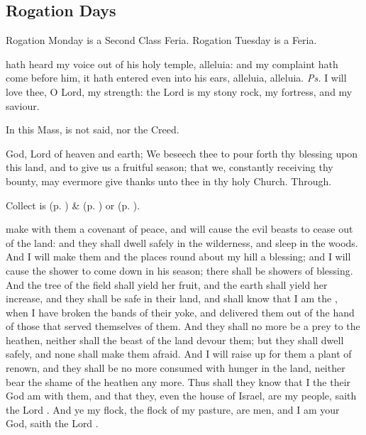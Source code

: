 \clearpage
\subsection{Rogation Days}
\begin{rubric}
	Rogation Monday is a Second Class Feria. Rogation Tuesday is a Feria.
\end{rubric}

\introit
{} hath heard my voice out of his holy temple, alleluia: and my complaint hath come before him, it hath entered even into his ears, alleluia, alleluia. \textit{Ps.} I will love thee, O Lord, my strength: the Lord is my stony rock, my fortress, and my saviour.
\begin{rubric}
    In this Mass,  is not said, nor the Creed.
\end{rubric}

\collect
{} God, Lord of heaven and earth; We beseech thee to pour forth thy blessing upon this land, and to give us a fruitful season; that we, constantly receiving thy bounty, may evermore give thanks unto thee in thy holy Church. Through.
\begin{rubric}
     Collect is  (p. \pageref{SPMaryInEaster}) \&   (p. \pageref{SPAgainst}) or  (p. \pageref{SPChiefBishop}).
\end{rubric}

 make with them a covenant of peace, and will cause the evil beasts to cease out of the land: and they shall dwell safely in the wilderness, and sleep in the woods. And I will make them and the places round about my hill a blessing; and I will cause the shower to come down in his season; there shall be showers of blessing. And the tree of the field shall yield her fruit, and the earth shall yield her increase, and they shall be safe in their land, and shall know that I am the , when I have broken the bands of their yoke, and delivered them out of the hand of those that served themselves of them. And they shall no more be a prey to the heathen, neither shall the beast of the land devour them; but they shall dwell safely, and none shall make them afraid. And I will raise up for them a plant of renown, and they shall be no more consumed with hunger in the land, neither bear the shame of the heathen any more. Thus shall they know that I the  their God am with them, and that they, even the house of Israel, are my people, saith the Lord . And ye my flock, the flock of my pasture, are men, and I am your God, saith the Lord .


